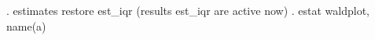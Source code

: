 . estimates restore est_iqr
(results est_iqr are active now)
{\smallskip}
. estat waldplot, name(a)
